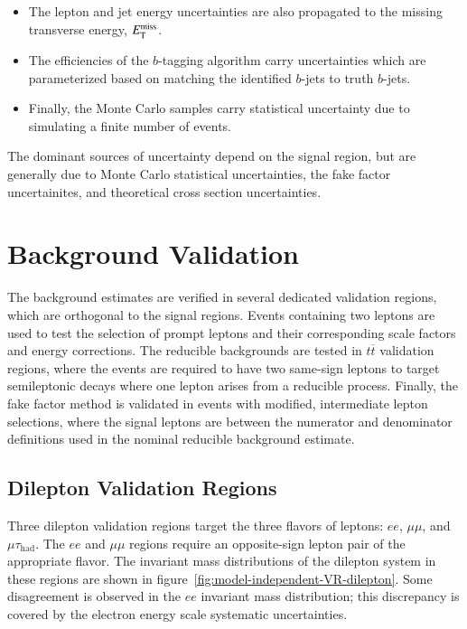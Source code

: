 \begin{itemize}
	\item The lepton and jet energy uncertainties are also propagated to the missing transverse energy, $E_{\text{T}}^{\text{miss}}$. 

	\item The efficiencies of the $b$-tagging algorithm carry uncertainties which are parameterized based on matching the identified $b$-jets to truth $b$-jets.

	\item Finally, the Monte Carlo samples carry statistical uncertainty due to simulating a finite number of events. 
\end{itemize}

The dominant sources of uncertainty depend on the signal region, but are generally due to Monte Carlo statistical uncertainties, the fake factor uncertainites, and theoretical cross section uncertainties. 

\section{Background Validation}\label{sec:model-independent-validation-regions}
The background estimates are verified in several dedicated validation regions, which are orthogonal to the signal regions. Events containing two leptons are used to test the selection of prompt leptons and their corresponding scale factors and energy corrections. The reducible backgrounds are tested in $t\overline{t}$ validation regions, where the events are required to have two same-sign leptons to target semileptonic decays where one lepton arises from a reducible process. Finally, the fake factor method is validated in events with modified, intermediate lepton selections, where the signal leptons are between the numerator and denominator definitions used in the nominal reducible background estimate.

\subsection{Dilepton Validation Regions}\label{sec:model-independent-validation-regions-dilepton}
Three dilepton validation regions target the three flavors of leptons: $ee$, $\mu\mu$, and $\mu\tau_{\mathrm{had}}$. The $ee$ and $\mu\mu$ regions require an opposite-sign lepton pair of the appropriate flavor. The invariant mass distributions of the dilepton system in these regions are shown in figure~\ref{fig:model-independent-VR-dilepton}. Some disagreement is observed in the $ee$ invariant mass distribution; this discrepancy is covered by the electron energy scale systematic uncertainties. 

